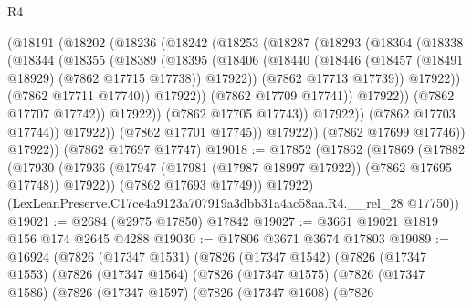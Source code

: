 \begin{lexlean}{R4}
\begin{coremodule}
                        (@18191
                          (@18202
                            (@18236
                              (@18242
                                (@18253
                                  (@18287
                                    (@18293
                                      (@18304
                                        (@18338
                                          (@18344
                                            (@18355
                                              (@18389
                                                (@18395
                                                  (@18406
                                                    (@18440
                                                      (@18446
                                                        (@18457
                                                          (@18491 @18929)
                                                          (@7862 @17715 @17738))
                                                        @17922))
                                                    (@7862 @17713 @17739))
                                                  @17922))
                                              (@7862 @17711 @17740))
                                            @17922))
                                        (@7862 @17709 @17741))
                                      @17922))
                                  (@7862 @17707 @17742))
                                @17922))
                            (@7862 @17705 @17743))
                          @17922))
                      (@7862 @17703 @17744))
                    @17922))
                (@7862 @17701 @17745))
              @17922))
          (@7862 @17699 @17746))
        @17922))
    (@7862 @17697 @17747)
@19018 := @17852
    (@17862
      (@17869
        (@17882
          (@17930 (@17936 (@17947 (@17981 (@17987 @18997 @17922)) (@7862 @17695 @17748)) @17922))
          (@7862 @17693 @17749))
        @17922)
      (LexLeanPreserve.C17ce4a9123a707919a3dbb31a4ac58aa.R4.__rel_28 @17750))
@19021 := @2684 (@2975 @17850) @17842
@19027 := @3661 @19021 @1819 @156 @174 @2645 @4288
@19030 := @17806 @3671 @3674 @17803
@19089 := @16924
    (@7826
      (@17347 @1531)
      (@7826
        (@17347 @1542)
        (@7826
          (@17347 @1553)
          (@7826
            (@17347 @1564)
            (@7826
              (@17347 @1575)
              (@7826
                (@17347 @1586)
                (@7826
                  (@17347 @1597)
                  (@7826
                    (@17347 @1608)
                    (@7826

\end{coremodule}
\end{lexlean}
